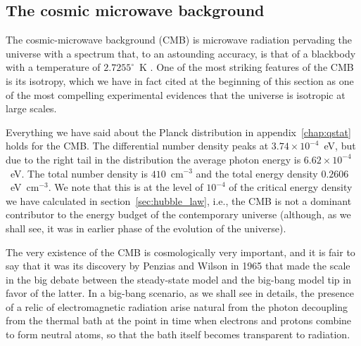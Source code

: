 \subsection{The cosmic microwave background}

The cosmic-microwave background (CMB) is microwave radiation pervading the universe
with a spectrum that, to an astounding accuracy, is that of a blackbody with a
temperature of $2.7255^\circ$~K . One of the most striking features of the CMB is its
isotropy,
which we have in fact cited at the beginning of this section as one of the most
compelling experimental evidences that the universe is isotropic at large scales.


Everything we have said about the Planck distribution in appendix~\ref{chap:qstat}
holds for the CMB. The differential number density peaks at $3.74 \times 10^{-4}$~eV,
but due to the right tail in the distribution the average photon energy is
$6.62 \times 10^{-4}$~eV. The total number density is $410$~cm$^{-3}$ and the total
energy density $0.2606$~eV~cm$^{-3}$. We note that this is at the level of $10^{-4}$
of the critical energy density we have calculated in section~\ref{sec:hubble_law},
i.e., the CMB is not a dominant contributor to the energy budget of the contemporary
universe (although, as we shall see, it was in earlier phase of the evolution of the
universe).

\begin{marginfigure}
  
  \caption{Spectrum of the CMB.}
  \label{fig:cmb}
\end{marginfigure}


The very existence of the CMB is cosmologically very important, and it is fair to
say that it was its discovery by Penzias and Wilson in 1965 that made the scale
in the big debate between the steady-state model and the big-bang model tip in favor
of the latter. In a big-bang scenario, as we shall see in details, the presence
of a relic of electromagnetic radiation arise natural from the photon decoupling
from the thermal bath at the point in time when electrons and protons combine to
form neutral atoms, so that the bath itself becomes transparent to radiation.


